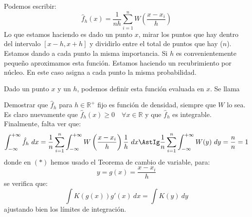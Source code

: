 Podemos escribir:
\begin{equation*}
    \hat{f}_h(x) = \frac{1}{nh}\sum_{i=1}^{n}W\left(\frac{x-x_i}{h}\right)
\end{equation*}
Lo que estamos haciendo es dado un punto $x$, mirar los puntos que hay dentro del intervalo $[x-h,x+h]$ y dividirlo entre el total de puntos que hay ($n$). Estamos dando a cada punto la misma importancia. Si $h$ es convenientemente pequeño aproximamos esta función. Estamos haciendo un recubrimiento por núcleo. En este caso asigna a cada punto la misma probabilidad.

Dado un punto $x$ y un $h$, podemos definir esta función evaluada en $x$. Se llama 


\begin{ejercicio}
    Demostrar que $\hat{f}_h$ para $h\in \mathbb{R}^+$ fijo es función de densidad, siempre que $W$ lo sea.\\

    \noindent
    Es claro nuevamente que $\hat{f}_h(x)\geq 0 \quad \forall x\in \mathbb{R}$ y que $\hat{f}_h$ es integrable. Finalmente, falta ver que:
    \begin{equation*}
        \int_{-\infty}^{+\infty} \hat{f}_h~dx  = \frac{1}{n}\sum_{i=1}^{n}\int_{-\infty}^{+\infty} W\left(\frac{x-x_i}{h}\right)\frac{1}{h}~dx  \AstIg \frac{1}{n}\sum_{i=1}^{n}\int_{-\infty}^{+\infty} W(y)~dy  = \frac{n}{n} = 1
    \end{equation*}
    donde en $(\ast)$ hemos usado el Teorema de cambio de variable, para:
    \begin{equation*}
        y = g(x) =  \frac{x-x_i}{h}
    \end{equation*}
    se verifica que:
    \begin{equation*}
        \int K(g(x))g'(x) ~dx= \int K(y)~dy
    \end{equation*}
    ajustando bien los límites de integración.
\end{ejercicio}

